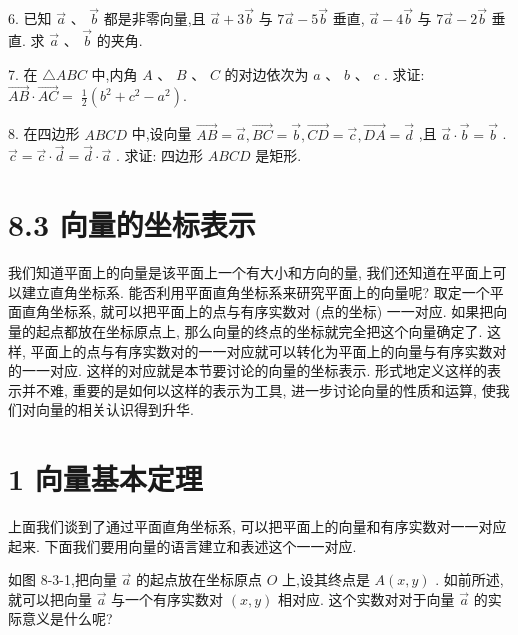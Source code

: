 \documentclass[10pt]{article}
\begin{document}
6. 已知 \(\overrightarrow{a}\text{ 、 }\overrightarrow{b}\) 都是非零向量,且 \(\overrightarrow{a} + 3\overrightarrow{b}\) 与 \(7\overrightarrow{a} - 5\overrightarrow{b}\) 垂直, \(\overrightarrow{a} - 4\overrightarrow{b}\) 与 \(7\overrightarrow{a} - 2\overrightarrow{b}\) 垂直. 求 \(\overrightarrow{a}\) 、 \(\overrightarrow{b}\) 的夹角.

7. 在 \(\bigtriangleup {ABC}\) 中,内角 \(A\text{ 、 }B\text{ 、 }C\) 的对边依次为 \(a\text{ 、 }b\text{ 、 }c\) . 求证: \(\overrightarrow{AB} \cdot  \overrightarrow{AC} = \; \frac{1}{2}\left( {{b}^{2} + {c}^{2} - {a}^{2}}\right) .\)

8. 在四边形 \({ABCD}\) 中,设向量 \(\overrightarrow{AB} = \overrightarrow{a},\overrightarrow{BC} = \overrightarrow{b},\overrightarrow{CD} = \overrightarrow{c},\overrightarrow{DA} = \overrightarrow{d}\) ,且 \(\overrightarrow{a} \cdot  \overrightarrow{b} = \overrightarrow{b}\) . \(\overrightarrow{c} = \overrightarrow{c} \cdot  \overrightarrow{d} = \overrightarrow{d} \cdot  \overrightarrow{a}\) . 求证: 四边形 \({ABCD}\) 是矩形.

\section*{8.3 向量的坐标表示}

我们知道平面上的向量是该平面上一个有大小和方向的量, 我们还知道在平面上可以建立直角坐标系. 能否利用平面直角坐标系来研究平面上的向量呢? 取定一个平面直角坐标系, 就可以把平面上的点与有序实数对 (点的坐标) 一一对应. 如果把向量的起点都放在坐标原点上, 那么向量的终点的坐标就完全把这个向量确定了. 这样, 平面上的点与有序实数对的一一对应就可以转化为平面上的向量与有序实数对的一一对应. 这样的对应就是本节要讨论的向量的坐标表示. 形式地定义这样的表示并不难, 重要的是如何以这样的表示为工具, 进一步讨论向量的性质和运算, 使我们对向量的相关认识得到升华.

\section*{1 向量基本定理}

上面我们谈到了通过平面直角坐标系, 可以把平面上的向量和有序实数对一一对应起来. 下面我们要用向量的语言建立和表述这个一一对应.

如图 8-3-1,把向量 \(\overrightarrow{a}\) 的起点放在坐标原点 \(O\) 上,设其终点是 \(A\left( {x,y}\right)\) . 如前所述,就可以把向量 \(\overrightarrow{a}\) 与一个有序实数对 \(\left( {x,y}\right)\) 相对应. 这个实数对对于向量 \(\overrightarrow{a}\) 的实际意义是什么呢?
\end{document}
